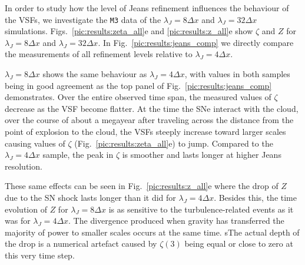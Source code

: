\documentclass{aa}		%
\begin{document}
In order to study  how the level of Jeans refinement influences the behaviour of the VSFs, we investigate the \texttt{M3} data of the \linebreak $\lambda_J = 8\Delta{}x$ and $\lambda_J = 32\Delta{}x$ simulations.
Figs.~\ref{pic:results:zeta_all}e and \ref{pic:results:z_all}e show $\zeta$ and $Z$ for  $\lambda_J = 8\Delta{}x$ and $\lambda_J = 32\Delta{}x$.
In Fig.~\ref{pic:results:jeans_comp} we directly compare the measurements of all refinement levels relative to $\lambda_J = 4\Delta{}x$.

$\lambda_J = 8\Delta{}x$ shows the same behaviour as $\lambda_J = 4\Delta{}x$, with values in both samples being in good agreement as the top panel of Fig.~\ref{pic:results:jeans_comp} demonstrates. 
Over the entire observed time span, the measured values of $\zeta$ decrease as the VSF become flatter.
At the time the SNe interact with the cloud, over the course of about a megayear after traveling across the distance from the point of explosion to the cloud, the VSFs steeply increase toward larger scales causing values of $\zeta$ (Fig.~\ref{pic:results:zeta_all}e) to jump.
Compared to the $\lambda_J = 4\Delta{}x$ sample, the peak in $\zeta$ is smoother and lasts longer at higher Jeans resolution.

These same effects can be seen in Fig.~\ref{pic:results:z_all}e where the drop of $Z$ due to the SN shock lasts longer than it did for $\lambda_J = 4\Delta{}x$. 
Besides this, the time evolution of $Z$ for $\lambda_J = 8\Delta{}x$ is as sensitive to the turbulence-related events as it was for $\lambda_J = 4\Delta{}x$.
The divergence produced when gravity has transferred the majority of power to smaller scales occurs at the same time. 
sThe actual depth of the drop is a numerical artefact caused by $\zeta(3)$ being equal or close to zero at this very time step. 
\end{document}
